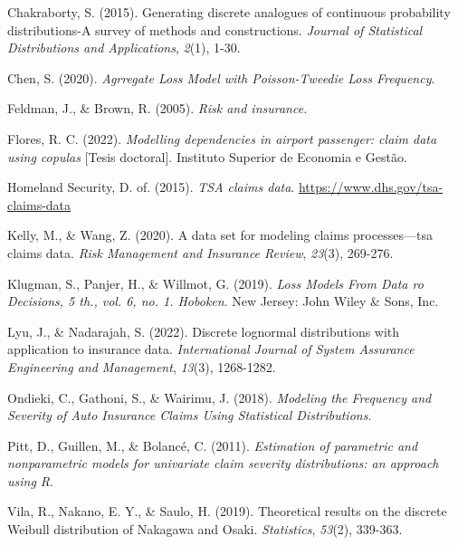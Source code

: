 \documentclass[
  letterpaper,
  onepage,
  openany]{scrreprt}
\newlength{\cslhangindent}
\newlength{\cslentryspacingunit} %
\newenvironment{CSLReferences}[2] %
 {%
  \setlength{\parindent}{0pt}
  \ifodd #1
  \let\oldpar\par
  \def\par{\hangindent=\cslhangindent\oldpar}
  \fi
  \setlength{\parskip}{#2\cslentryspacingunit}
 }%
 {}
\begin{document}
\hypertarget{refs}{}
\begin{CSLReferences}{1}{0}
\leavevmode{}%
Chakraborty, S. (2015). Generating discrete analogues of continuous
probability distributions-A survey of methods and constructions.
\emph{Journal of Statistical Distributions and Applications},
\emph{2}(1), 1-30.

\leavevmode{}%
Chen, S. (2020). \emph{Agrregate Loss Model with Poisson-Tweedie Loss
Frequency}.

\leavevmode{}%
Feldman, J., \& Brown, R. (2005). \emph{Risk and insurance}.

\leavevmode{}%
Flores, R. C. (2022). \emph{Modelling dependencies in airport passenger:
claim data using copulas} {[}Tesis doctoral{]}. Instituto Superior de
Economia e Gest{ã}o.

\leavevmode{}%
Homeland Security, D. of. (2015). \emph{TSA claims data}.
\url{https://www.dhs.gov/tsa-claims-data}

\leavevmode{}%
Kelly, M., \& Wang, Z. (2020). A data set for modeling claims
processes---tsa claims data. \emph{Risk Management and Insurance
Review}, \emph{23}(3), 269-276.

\leavevmode{}%
Klugman, S., Panjer, H., \& Willmot, G. (2019). \emph{Loss Models From
Data ro Decisions, 5 th., vol. 6, no. 1. Hoboken}. New Jersey: John
Wiley \& Sons, Inc.

\leavevmode{}%
Lyu, J., \& Nadarajah, S. (2022). Discrete lognormal distributions with
application to insurance data. \emph{International Journal of System
Assurance Engineering and Management}, \emph{13}(3), 1268-1282.

\leavevmode{}%
Ondieki, C., Gathoni, S., \& Wairimu, J. (2018). \emph{Modeling the
Frequency and Severity of Auto Insurance Claims Using Statistical
Distributions}.

\leavevmode{}%
Pitt, D., Guillen, M., \& Bolancé, C. (2011). \emph{Estimation of
parametric and nonparametric models for univariate claim severity
distributions: an approach using R}.

\leavevmode{}%
Vila, R., Nakano, E. Y., \& Saulo, H. (2019). Theoretical results on the
discrete Weibull distribution of Nakagawa and Osaki. \emph{Statistics},
\emph{53}(2), 339-363.

\end{CSLReferences}
\end{document}
